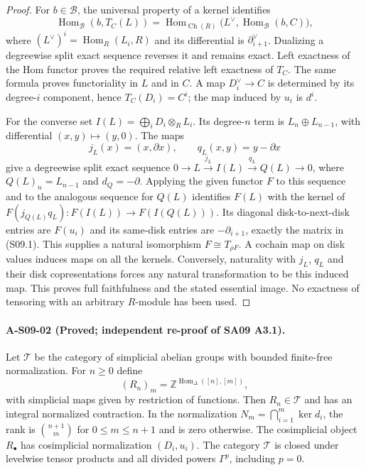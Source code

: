 \begin{proof}
For $b\in\mathcal B$, the universal property of a kernel identifies
\[
 \operatorname{Hom}_{\mathcal B}(b,T_C(L))
 =\operatorname{Hom}_{\operatorname{Ch}(R)}
 \bigl(L^\vee,\operatorname{Hom}_{\mathcal B}(b,C)\bigr),
\]
where $(L^\vee)^i=\operatorname{Hom}_R(L_i,R)$ and its differential
is $\partial_{i+1}^{\vee}$.  Dualizing a degreewise split exact
sequence reverses it and remains exact.  Left exactness of the Hom
functor proves the required relative left exactness of $T_C$.
The same formula proves functoriality in $L$ and in $C$.  A map
$D_i^\vee\to C$ is determined by its degree-$i$ component, hence
$T_C(D_i)=C^i$; the map induced by $u_i$ is $d^i$.

For the converse set $I(L)=\bigoplus_i D_i\otimes_RL_i$.
Its degree-$n$ term is $L_n\oplus L_{n-1}$, with differential
$(x,y)\mapsto(y,0)$.  The maps
\[
 j_L(x)=(x,\partial x),\qquad q_L(x,y)=y-\partial x
\]
give a degreewise split exact sequence
$0\to L\xrightarrow{j_L}I(L)\xrightarrow{q_L}Q(L)\to0$,
where $Q(L)_n=L_{n-1}$ and $d_Q=-\partial$.
Applying the given functor $F$ to this sequence and to the analogous
sequence for $Q(L)$ identifies $F(L)$ with the kernel of
$F(j_{Q(L)}q_L):F(I(L))\to F(I(Q(L)))$.
Its diagonal disk-to-next-disk entries are $F(u_i)$ and its
same-disk entries are $-\partial_{i+1}$, exactly the matrix in
(S09.1).  This supplies a natural isomorphism $F\cong T_{\rho F}$.
A cochain map on disk values induces maps on all the kernels.
Conversely, naturality with $j_L$, $q_L$ and their disk copresentations
forces any natural transformation to be this induced map.  This proves
full faithfulness and the stated essential image.  No exactness of
tensoring with an arbitrary $R$-module has been used.
\end{proof}

\paragraph{A-S09-02 (Proved; independent re-proof of SA09 A3.1).}
Let $\mathcal T$ be the category of simplicial abelian groups with
bounded finite-free normalization.  For $n\geq0$ define
\[
 (R_n)_m=\mathbb Z^{\operatorname{Hom}_\Delta([n],[m])},
\]
with simplicial maps given by restriction of functions.
Then $R_n\in\mathcal T$ and has an integral normalized contraction.
In the normalization $N_m=\bigcap_{i=1}^{m}\ker d_i$, the rank is
$\binom{n+1}{m}$ for $0\leq m\leq n+1$ and is zero otherwise.
The cosimplicial object $R_\bullet$ has cosimplicial normalization
$(D_i,u_i)$.  The category $\mathcal T$ is closed under levelwise
tensor products and all divided powers $\Gamma^p$, including $p=0$.

